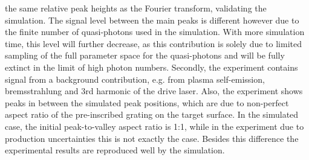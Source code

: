 \documentclass[10pt]{scrartcl}
\begin{document}
the same relative peak heights as the Fourier transform, validating the
simulation.  The signal level between the main peaks is different however due to
the finite number of quasi-photons used in the simulation.  With more simulation
time, this level will further decrease, as this contribution is solely due to
limited sampling of the full parameter space for the quasi-photons and will be
fully extinct in the limit of high photon numbers.  Secondly, the experiment
contains signal from a background contribution, e.g. from plasma self-emission,
bremsstrahlung and 3rd harmonic of the drive laser.  Also, the experiment shows
peaks in between the simulated peak positions, which are due to non-perfect
aspect ratio of the pre-inscribed grating on the target surface.  In the
simulated case, the initial peak-to-valley aspect ratio is 1:1, while in the
experiment due to production uncertainties this is not exactly the case.
Besides this difference the experimental results are reproduced well by the
simulation.

%
\end{document}

